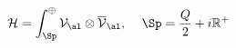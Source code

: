 \begin{equation}
\mathcal{H}=\int_{\Sp}^{\oplus}\mathcal{V}_{\al}\otimes
\overline{\mathcal{V}}_{\al},\, \quad
\Sp=\frac{Q}{2}+i\mathbb{R}^+\nonumber
\end{equation}

